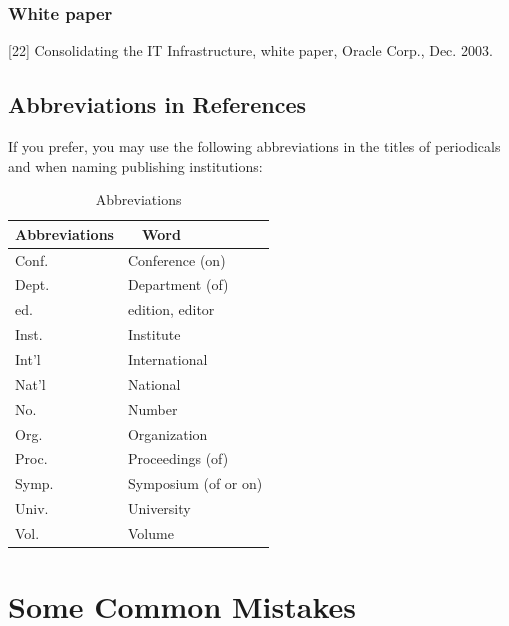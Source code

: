 \documentclass[11pt, onecolumn, twoside, a4paper]{article}
\begin{document}
\subsubsection{White paper}
[22] Consolidating the IT Infrastructure, white paper, Oracle Corp., Dec. 2003.



\subsection{Abbreviations in References}

If you prefer, you may use the following abbreviations in the titles of periodicals and when naming publishing institutions:

\begin{table}[hbtp]
 \caption{Abbreviations}
 \label{table:data_type}
 \begin{center}
  \begin{tabular}{ll}
   \hline
   Abbreviations &　Word  \\
   \hline \hline
Conf. & Conference (on)\\
Dept.  & Department (of) \\
ed. & edition, editor\\
Inst. & Institute\\
Int'l & International\\
Nat'l & National\\
No. & Number\\
Org. & Organization\\
Proc. & Proceedings (of)\\
Symp. & Symposium (of or on)\\
Univ. & University\\
Vol. & Volume\\
   \hline
  \end{tabular}
 \end{center}
\end{table}




\section{Some Common Mistakes}
\end{document}
